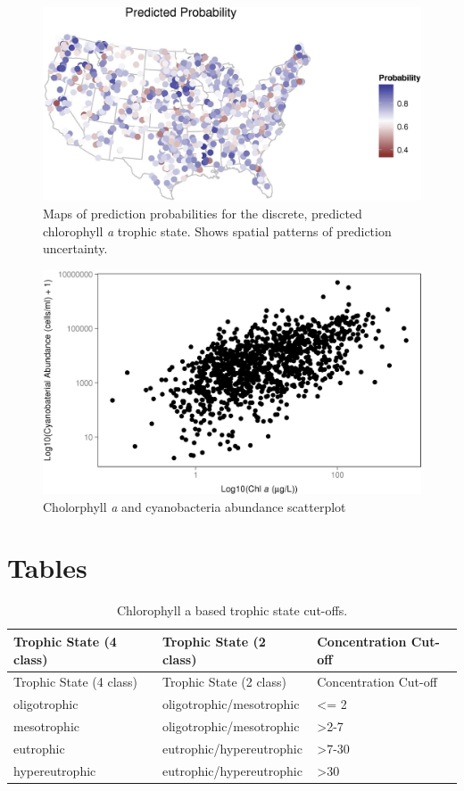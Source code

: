 \documentclass[11pt,]{article}
\begin{document}
\begin{figure}[htbp]
\centering
\includegraphics{manuscript_files/figure-latex/predicted_prob_map-1.jpeg}
\caption{Maps of prediction probabilities for the discrete, predicted
chlorophyll \textit{a} trophic state. Shows spatial patterns of
prediction uncertainty. \label{fig:predicted_prob_map}}
\end{figure}

\newpage

\begin{figure}[htbp]
\centering
\includegraphics{manuscript_files/figure-latex/chla_cyano_scatterplot-1.jpeg}
\caption{Cholorphyll \emph{a} and cyanobacteria abundance
scatterplot\label{fig:scatterplot}}
\end{figure}

\newpage

\section{Tables}\label{tables}

\begin{longtable}[c]{@{}lll@{}}
\caption{Chlorophyll a based trophic state cut-offs.
\label{tab:trophicStateTable}}\tabularnewline
\toprule
Trophic State (4 class) & Trophic State (2 class) & Concentration
Cut-off\tabularnewline
\midrule
\endfirsthead
\toprule
Trophic State (4 class) & Trophic State (2 class) & Concentration
Cut-off\tabularnewline
\midrule
\endhead
oligotrophic & oligotrophic/mesotrophic & \textless{}= 2\tabularnewline
mesotrophic & oligotrophic/mesotrophic &
\textgreater{}2-7\tabularnewline
eutrophic & eutrophic/hypereutrophic & \textgreater{}7-30\tabularnewline
hypereutrophic & eutrophic/hypereutrophic &
\textgreater{}30\tabularnewline
\bottomrule
\end{longtable}
\end{document}

